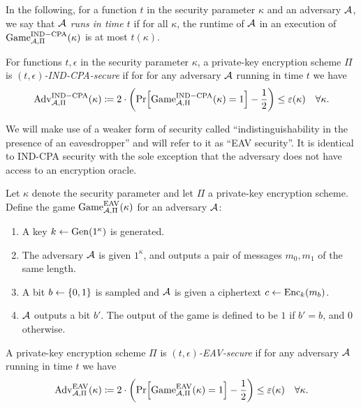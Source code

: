 In the following, for a function $t$ in the security parameter $\kappa$ and an adversary $\mathcal{A}$, we say that \emph{$\mathcal{A}$ runs in time $t$} if for all $\kappa$, the runtime of $\mathcal{A}$ in an execution of $\mathrm{Game}_{\mathcal{A}, \Pi}^{\mathrm{IND-CPA}}(\kappa)$ is at most $t(\kappa)$.

\begin{definition}
	For functions $t, \epsilon$ in the security parameter $\kappa$, a private-key encryption scheme $\Pi$ is \emph{$(t, \epsilon)$-IND-CPA-secure} if for for any adversary $\mathcal{A}$ running in time $t$ we have
	\begin{align*}
		\advantage{\Pi}{IND-CPA}(\kappa) \coloneqq 2 \cdot \left(\pr{\game{\Pi}{IND-CPA}(\kappa) = 1} - \frac{1}{2}\right) \le \epsilon(\kappa) \quad \forall \kappa.
	\end{align*}
\end{definition}

We will make use of a weaker form of security called ``indistinguishability in the presence of an eavesdropper'' \cite{introduction-to-modern-cryptography} and will refer to it as ``EAV security''. It is identical to IND-CPA security with the sole exception that the adversary does not have access to an encryption oracle.

\begin{definition}
	Let $\kappa$ denote the security parameter and let $\Pi$ a private-key encryption scheme. Define the game $\mathrm{Game}_{\mathcal{A}, \Pi}^{\mathrm{EAV}}(\kappa)$ for an adversary $\mathcal{A}$:
	\begin{enumerate}[1.]
		\item A key $k \leftarrow \mathrm{Gen}(1^\kappa)$ is generated.
		\item The adversary $\mathcal{A}$ is given $1^\kappa$, and outputs a pair of messages $m_0, m_1$ of the same length.
		\item A bit $b \leftarrow \{0, 1\}$ is sampled and $\mathcal{A}$ is given a ciphertext $c \leftarrow \mathrm{Enc}_k(m_b)$.
		\item $\mathcal{A}$ outputs a bit $b'$. The output of the game is defined to be $1$ if $b' = b$, and $0$ otherwise.
	\end{enumerate}
\end{definition}

\begin{definition}
	A private-key encryption scheme $\Pi$ is \emph{$(t, \epsilon)$-EAV-secure} if for any adversary $\mathcal{A}$ running in time $t$ we have
	\begin{align*}
		\advantage{\Pi}{EAV}(\kappa) \coloneqq 2 \cdot \left(\pr{\game{\Pi}{EAV}(\kappa) = 1} - \frac{1}{2}\right) \le \epsilon(\kappa) \quad \forall \kappa.
	\end{align*}
\end{definition}


